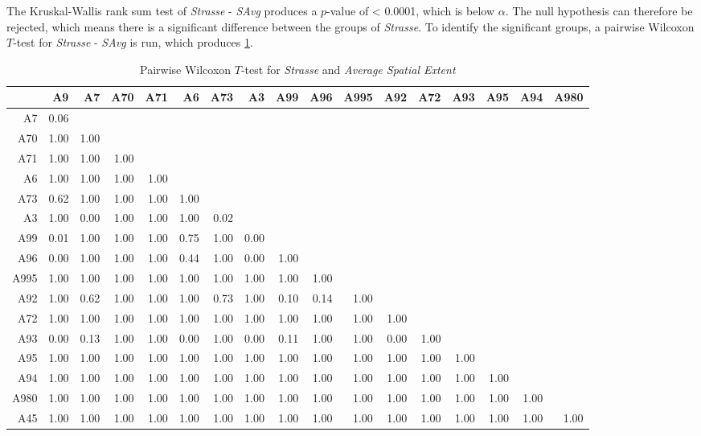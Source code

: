 The Kruskal-Wallis rank sum test of \textit{Strasse} - \textit{SAvg} produces a $p$-value of < 0.0001, which is below $\alpha$. The null hypothesis can therefore be rejected, which means there is a significant difference between the groups of \textit{Strasse}. To identify the significant groups, a pairwise Wilcoxon $T$-test for \textit{Strasse} - \textit{SAvg} is run, which produces \cref{tbl:wilcoxon_arbis_matched_Strasse_SAvg}. 
\begin{table}[ht!]
	\tiny
	\setlength{\tabcolsep}{4pt}
	\centering
	\begin{tabular}{rrrrrrrrrrrrrrrrr}
		\hline
			& A9 & A7 & A70 & A71 & A6 & A73 & A3 & A99 & A96 & A995 & A92 & A72 & A93 & A95 & A94 & A980 \\ 
		\hline
		A7   & 0.06 &  &  &  &  &  &  &  &  &  &  &  &  &  &  &  \\ 
		A70  & 1.00 & 1.00 &  &  &  &  &  &  &  &  &  &  &  &  &  &  \\ 
		A71  & 1.00 & 1.00 & 1.00 &  &  &  &  &  &  &  &  &  &  &  &  &  \\ 
		A6   & 1.00 & 1.00 & 1.00 & 1.00 &  &  &  &  &  &  &  &  &  &  &  &  \\ 
		A73  & 0.62 & 1.00 & 1.00 & 1.00 & 1.00 &  &  &  &  &  &  &  &  &  &  &  \\ 
		A3   & 1.00 & 0.00 & 1.00 & 1.00 & 1.00 & 0.02 &  &  &  &  &  &  &  &  &  &  \\ 
		A99  & 0.01 & 1.00 & 1.00 & 1.00 & 0.75 & 1.00 & 0.00 &  &  &  &  &  &  &  &  &  \\ 
		A96  & 0.00 & 1.00 & 1.00 & 1.00 & 0.44 & 1.00 & 0.00 & 1.00 &  &  &  &  &  &  &  &  \\ 
		A995 & 1.00 & 1.00 & 1.00 & 1.00 & 1.00 & 1.00 & 1.00 & 1.00 & 1.00 &  &  &  &  &  &  &  \\ 
		A92  & 1.00 & 0.62 & 1.00 & 1.00 & 1.00 & 0.73 & 1.00 & 0.10 & 0.14 & 1.00 &  &  &  &  &  &  \\ 
		A72  & 1.00 & 1.00 & 1.00 & 1.00 & 1.00 & 1.00 & 1.00 & 1.00 & 1.00 & 1.00 & 1.00 &  &  &  &  &  \\ 
		A93  & 0.00 & 0.13 & 1.00 & 1.00 & 0.00 & 1.00 & 0.00 & 0.11 & 1.00 & 1.00 & 0.00 & 1.00 &  &  &  &  \\ 
		A95  & 1.00 & 1.00 & 1.00 & 1.00 & 1.00 & 1.00 & 1.00 & 1.00 & 1.00 & 1.00 & 1.00 & 1.00 & 1.00 &  &  &  \\ 
		A94  & 1.00 & 1.00 & 1.00 & 1.00 & 1.00 & 1.00 & 1.00 & 1.00 & 1.00 & 1.00 & 1.00 & 1.00 & 1.00 & 1.00 &  &  \\ 
		A980 & 1.00 & 1.00 & 1.00 & 1.00 & 1.00 & 1.00 & 1.00 & 1.00 & 1.00 & 1.00 & 1.00 & 1.00 & 1.00 & 1.00 & 1.00 &  \\ 
		A45  & 1.00 & 1.00 & 1.00 & 1.00 & 1.00 & 1.00 & 1.00 & 1.00 & 1.00 & 1.00 & 1.00 & 1.00 & 1.00 & 1.00 & 1.00 & 1.00 \\ 
		\bottomrule
	\end{tabular}
	\caption{Pairwise Wilcoxon $T$-test for \textit{Strasse} and \textit{Average Spatial Extent}}
	\label{tbl:wilcoxon_arbis_matched_Strasse_SAvg}
\end{table}
